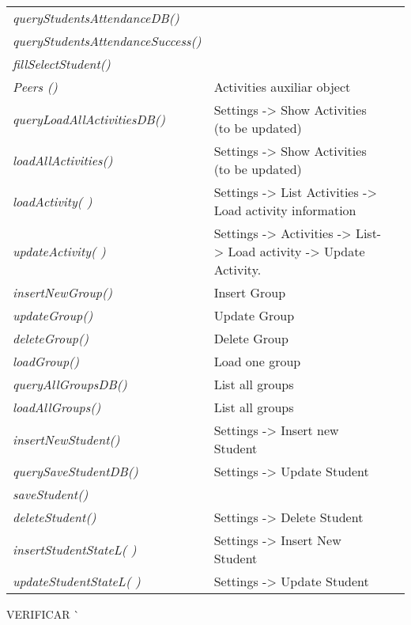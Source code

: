\begin{bclogo}[couleur=orange!30,logo=\bcbook, arrondi=0.1,ombre=true ]
\begin{tabular}{lll}
\emph{ queryStudentsAttendanceDB() }    & {  }\\
\emph{ queryStudentsAttendanceSuccess()}&    {   }\\
\emph{ fillSelectStudent() }          & {  } \\


\emph{ Peers () }                          & Activities auxiliar object \\


\emph { queryLoadAllActivitiesDB()}     & { Settings -> Show Activities (to be updated) } \\
\emph { loadAllActivities() }           &{ Settings -> Show Activities (to be updated) } \\
\emph { loadActivity( )}                & {Settings -> List Activities -> Load activity information } \\
\emph { updateActivity(  )}             &{Settings -> Activities -> List-> Load activity -> Update Activity. }\\



\emph{ insertNewGroup()}               &{ Insert Group }   \\
\emph{ updateGroup()  }                & {  Update Group  }\\
\emph{ deleteGroup() }                 &{ Delete Group } \\
\emph{ loadGroup()             }        & { Load  one group } \\
\emph{ queryAllGroupsDB()      }        & { List all groups }  \\
\emph{ loadAllGroups()         }        & {  List all groups }  \\
\emph{ insertNewStudent() }            & { Settings -> Insert new Student  } \\
\emph{ querySaveStudentDB() }          &  Settings -> Update Student \\
\emph{ saveStudent() }                 & { } \\
\emph{ deleteStudent()}                & { Settings -> Delete Student } \\
\emph{ insertStudentStateL( ) }         & { Settings -> Insert New Student  }\\
\emph{ updateStudentStateL( )  }        & { Settings ->  Update Student }\\

\end{tabular}

\end{bclogo}  
{\huge  VERIFICAR ^^ }


